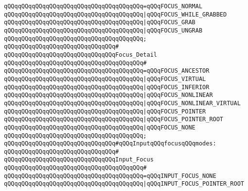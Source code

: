 \verb|qQQqqQQqqQQqqQQqqQQqqQQqqQQqqQQqqQQqqQQq=qQQqFOCUS_NORMAL|\newline
\verb|qQQqqQQqqQQqqQQqqQQqqQQqqQQqqQQqqQQqqQQq|\verb#|qQQqFOCUS_WHILE_GRABBED#\newline
\verb|qQQqqQQqqQQqqQQqqQQqqQQqqQQqqQQqqQQqqQQq|\verb#|qQQqFOCUS_GRAB#\newline
\verb|qQQqqQQqqQQqqQQqqQQqqQQqqQQqqQQqqQQqqQQq|\verb#|qQQqFOCUS_UNGRAB#\newline
\verb|qQQqqQQqqQQqqQQqqQQqqQQqqQQqqQQqqQQqqQQq;|\newline
\verb|qQQqqQQqqQQqqQQqqQQqqQQqqQQqqQQq#|\newline
\verb|qQQqqQQqqQQqqQQqqQQqqQQqqQQqqQQqFocus_Detail|\newline
\verb|qQQqqQQqqQQqqQQqqQQqqQQqqQQqqQQqqQQqqQQq#|\newline
\verb|qQQqqQQqqQQqqQQqqQQqqQQqqQQqqQQqqQQqqQQq=qQQqFOCUS_ANCESTOR|\newline
\verb|qQQqqQQqqQQqqQQqqQQqqQQqqQQqqQQqqQQqqQQq|\verb#|qQQqFOCUS_VIRTUAL#\newline
\verb|qQQqqQQqqQQqqQQqqQQqqQQqqQQqqQQqqQQqqQQq|\verb#|qQQqFOCUS_INFERIOR#\newline
\verb|qQQqqQQqqQQqqQQqqQQqqQQqqQQqqQQqqQQqqQQq|\verb#|qQQqFOCUS_NONLINEAR#\newline
\verb|qQQqqQQqqQQqqQQqqQQqqQQqqQQqqQQqqQQqqQQq|\verb#|qQQqFOCUS_NONLINEAR_VIRTUAL#\newline
\verb|qQQqqQQqqQQqqQQqqQQqqQQqqQQqqQQqqQQqqQQq|\verb#|qQQqFOCUS_POINTER#\newline
\verb|qQQqqQQqqQQqqQQqqQQqqQQqqQQqqQQqqQQqqQQq|\verb#|qQQqFOCUS_POINTER_ROOT#\newline
\verb|qQQqqQQqqQQqqQQqqQQqqQQqqQQqqQQqqQQqqQQq|\verb#|qQQqFOCUS_NONE#\newline
\verb|qQQqqQQqqQQqqQQqqQQqqQQqqQQqqQQqqQQqqQQq;|\newline
\newline
\verb|qQQqqQQqqQQqqQQqqQQqqQQqqQQqqQQq#qQQqInputqQQqfocusqQQqmodes:|\newline
\verb|qQQqqQQqqQQqqQQqqQQqqQQqqQQqqQQq#|\newline
\verb|qQQqqQQqqQQqqQQqqQQqqQQqqQQqqQQqInput_Focus|\newline
\verb|qQQqqQQqqQQqqQQqqQQqqQQqqQQqqQQqqQQqqQQq#|\newline
\verb|qQQqqQQqqQQqqQQqqQQqqQQqqQQqqQQqqQQqqQQq=qQQqINPUT_FOCUS_NONE|\newline
\verb|qQQqqQQqqQQqqQQqqQQqqQQqqQQqqQQqqQQqqQQq|\verb#|qQQqINPUT_FOCUS_POINTER_ROOT#\newline
